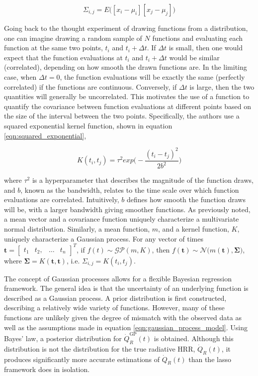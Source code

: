 \documentclass{article}
\begin{document}
 \begin{equation}
  \label{eqn:covariance_matrix}
  \Sigma_{i,j} = E\bigg([x_i- \mu_i][x_j - \mu_j] \bigg)
\end{equation}

Going back to the thought experiment of drawing functions from a distribution, one can imagine drawing a random sample of $N$ functions and evaluating each function at the same two points, $t_i$ and $t_i + \Delta t$. If $\Delta t$ is small, then one would expect that the function evaluations at $t_i$ and $t_i + \Delta t$ would be similar (correlated), depending on how smooth the drawn functions are. In the limiting case, when $\Delta t = 0$, the function evaluations will be exactly the same (perfectly correlated) if the functions are continuous. Conversely, if $\Delta t$ is large, then the two quantities will generally be uncorrelated. This motivates the use of a function to quantify the covariance between function evaluations at different points based on the size of the interval between the two points. Specifically, the authors use a squared exponential kernel function, shown in equation \ref{eqn:squared_exponential}, 


 \begin{equation}
  \label{eqn:squared_exponential}
    K(t_i, t_j) = \tau^2exp\bigg(-\frac{(t_i-t_j)^2}{2b^2}\bigg)
\end{equation}

\noindent where $\tau^2$ is a hyperparameter that describes the magnitude of the function draws, and $b$, known as the bandwidth, relates to the time scale over which function evaluations are correlated. Intuitively, $b$ defines how smooth the function draws will be, with a larger bandwidth giving smoother functions. As previously noted, a mean vector and a covariance function uniquely characterize a multivariate normal distribution. Similarly, a mean function, $m$, and a kernel function, $K$, uniquely characterize a Gaussian process. For any vector of times $\boldsymbol{t} = \begin{bmatrix}  t_1 & t_2, & \ldots & t_n \end{bmatrix}^T$, if $f(t) \sim \mathcal{GP}(m,K)$, then $f(\boldsymbol{t}) \sim \mathcal{N}\Big(m(\boldsymbol{t}), \boldsymbol{\Sigma}\Big)$, where $\boldsymbol{\Sigma} =  K(\boldsymbol{t},\boldsymbol{t})$, i.e. $\Sigma_{i,j} = K(t_i, t_j)$. 

The concept of Gaussian processes allows for a flexible Bayesian regression framework. The general idea is that the uncertainty of an underlying function is described as a Gaussian process. A prior distribution is first constructed, describing a relatively wide variety of functions. However, many of these functions are unlikely given the degree of mismatch with the observed data as well as the assumptions made in equation \ref{eqn:gaussian_process_model}. Using Bayes' law, a posterior distribution for  $\dot{Q}_{R}^{\text{GP}}(t)$ is obtained. Although this distribution is not the distribution for the true radiative HRR, $\dot{Q}_{R}(t)$, it produces significantly more accurate estimations of $\dot{Q}_{R}(t)$ than the lasso framework does in isolation. 
\end{document}

